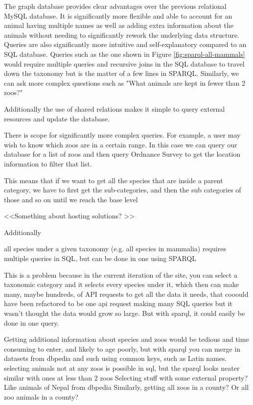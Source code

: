 \documentclass[a4paper]{article}
\begin{document}
The graph database provides clear advantages over the previous relational MySQL database. 
It is significantly more flexible and able to account for an animal having multiple names as well as adding extra information about the animals without needing to significantly rework the underlying data structure. Queries are also significantly more intuitive and self-explanatory compared to an SQL database.
Queries such as the one shown in Figure \ref{fig:sparql-all-mammals} would require multiple queries and recursive joins in the SQL database to travel down the taxonomy but is the matter of a few lines in SPARQL. Similarly, we can ask more complex questions such as "What animals are kept in fewer than 2 zoos?" 


Additionally the use of shared relations makes it simple to query external resources and update the database. 



There is scope for significantly more complex queries. For example, a user may wish to know which zoos are in a certain range. In this case we can query our database for a list of zoos and then query Ordnance Survey to get the location information to filter that list.

This means that if we want to get all the species that are inside a parent category, we have to first get the sub-categories, and then the sub categories of those and so on until we reach the base level

<<Something about hosting solutions? >>


Additionally 

\iffalse 

all species under a given taxonomy (e.g. all species in mammalia) requires multiple queries in SQL, but can be done in one using SPARQL

This is a problem because in the current iteration of the site, you can select a taxonomic category and it selects every species under it, which then can make many, maybe hundreds, of API requests to get all the data it needs, that cooould have been refactored to be one api request making many SQL queries but it wasn't thought the data would grow so large. But with sparql, it could easily be done in one query. 

Getting additional information about species and zoos would be tedious and time consuming to enter, and likely to age poorly, but with sparql you can merge in datasets from dbpedia and such using common keys, such as Latin names.
selecting animals not at any zoos is possible in sql, but the sparql looks neater
similar with ones at less than 2 zoos
Selecting stuff with some external property? Like animals of Nepal from dbpedia
Similarly, getting all zoos in a county?
Or all zoo animals in a county?
\end{document}
